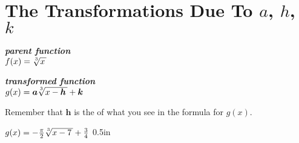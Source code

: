\section{The Transformations Due To $a$, $h$, $k$}

\begin{tcbraster}[
    raster equal height,
    raster left skip = 1in, raster right skip = 1in, 
    raster column skip = 0.5in,
    raster before skip = 1\baselineskip, raster after skip = 1\baselineskip,
    ]
    \begin{tcolorbox}[]
        \centering
        {\bfseries\itshape parent function}\\[0.5\baselineskip]
        \large
        $f(x) = \myRoot[3]{x}$
    \end{tcolorbox}
    \begin{tcolorbox}[]
        \centering
        {\bfseries\itshape transformed function}\\[0.5\baselineskip]
        \large
        $g(x) = \bm{a} \myRoot[3]{x-\bm{h}} + \bm{k}$
    \end{tcolorbox}
\end{tcbraster}

\begin{tcbraster}[]
\end{tcbraster}


Remember that $\bm{h}$ is the  
of what you see in the formula for $g(x)$.



{
    $g(x) = -\frac{\pi}{2}\myRoot[3]{x-7} + \frac{3}{4}$
}{0.5in}



